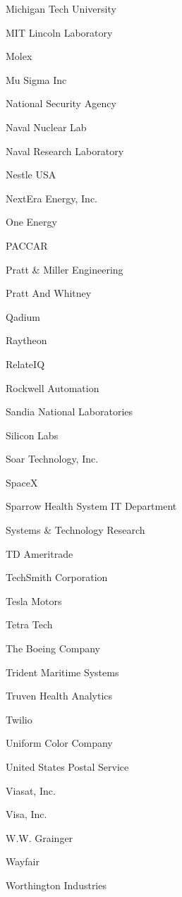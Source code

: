 \documentclass[twoside]{article}
\begin{document}
\begin{center}
\begin{multicols}{5}
\begin{FlushLeft}
\begin{compactitem}
\item Michigan Tech University
\item MIT Lincoln Laboratory
\item Molex
\item Mu Sigma Inc
\item National Security Agency
\item Naval Nuclear Lab
\item Naval Research Laboratory
\item Nestle USA
\item NextEra Energy, Inc.
\item One Energy
\item PACCAR
\item Pratt \& Miller Engineering
\item Pratt And Whitney
\item Qadium
\item Raytheon
\item RelateIQ
\item Rockwell Automation
\item Sandia National Laboratories
\item Silicon Labs
\item Soar Technology, Inc.
\item SpaceX
\item Sparrow Health System IT Department
\item Systems \& Technology Research
\item TD Ameritrade
\item TechSmith Corporation
\item Tesla Motors
\item Tetra Tech
\item The Boeing Company
\item Trident Maritime Systems
\item Truven Health Analytics
\item Twilio
\item Uniform Color Company
\item United States Postal Service
\item Viasat, Inc.
\item Visa, Inc.
\item W.W. Grainger
\item Wayfair
\item Worthington Industries
\end{compactitem}
        \end{FlushLeft}
        \vspace{1em}

\end{multicols}
\end{center}
\end{document}
